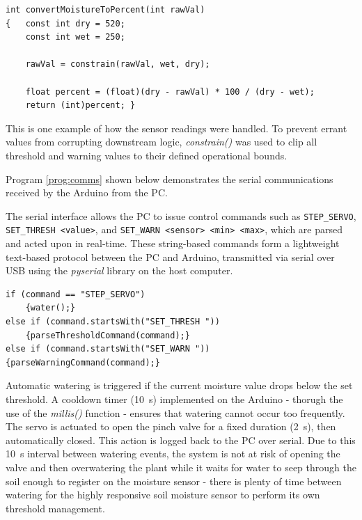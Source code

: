 \documentclass[a4paper,11pt]{article}
\begin{document}
\begin{lstlisting}[style=cpp-style, 
caption={Arduino moisture conversion}, label={prog:moist}]
int convertMoistureToPercent(int rawVal)
{   const int dry = 520;
    const int wet = 250;

    rawVal = constrain(rawVal, wet, dry);

    float percent = (float)(dry - rawVal) * 100 / (dry - wet);
    return (int)percent; }
\end{lstlisting}

This is one example of how the sensor readings were handled.
To prevent errant values from corrupting downstream logic, 
\textit{constrain()} was used to clip all threshold and 
warning values to their defined operational bounds.

Program \ref{prog:comms} shown below demonstrates the serial communications
received by the Arduino from the PC.

The serial interface allows the PC to issue control commands such as 
\texttt{STEP\_SERVO}, \texttt{SET\_THRESH <value>}, and 
\texttt{SET\_WARN <sensor> <min> <max>}, which are parsed and acted upon 
in real-time.
These string-based commands form a lightweight text-based protocol between 
the PC and Arduino, transmitted via 
serial over USB using the \textit{pyserial} library 
on the host computer. 

\begin{lstlisting}[style=cpp-style, 
caption={Communication with the PC}, label={prog:comms}]
if (command == "STEP_SERVO")
    {water();}
else if (command.startsWith("SET_THRESH "))
    {parseThresholdCommand(command);}
else if (command.startsWith("SET_WARN "))
{parseWarningCommand(command);}
\end{lstlisting}

Automatic watering is triggered if the current moisture value drops below 
the set threshold. A cooldown timer (\SI{10}{\second}) implemented on the Arduino - 
thorugh the use of the \textit{millis()} function -
ensures that watering cannot occur too frequently. 
The servo is actuated to open the 
pinch valve for a fixed duration (\SI{2}{\second}), then automatically closed. 
This action is logged back to the PC over serial.
Due to this \SI{10}{\second} interval between watering events,
the system is not at risk of opening the valve 
and then overwatering the plant while it waits for water
to seep through the soil enough to register on the moisture sensor - 
there is plenty of time between watering for the highly responsive
soil moisture sensor to perform its own threshold management.
\end{document}
